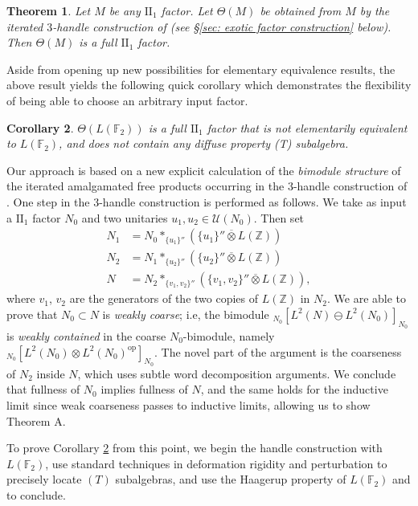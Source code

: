 \documentclass[10pt]{amsart}
\numberwithin{equation}{section}
\newtheorem{main}{Theorem}
\newtheorem{mcor}[main]{Corollary}
\theoremstyle{definition}
\newcommand{\ootimes}{\mathbin{\overline{\otimes}}}
\begin{document}
\begin{main} \label{main: fullness}
Let $M$ be any $\mathrm{II}_1$ factor.  Let $\Theta(M)$ be obtained from $M$ by the iterated $3$-handle construction of \cite{gao20253handleconstructionii1factors} (see \S \ref{sec: exotic factor construction} below).  Then $\Theta(M)$ is a full $\mathrm{II}_1$ factor.
\end{main}

Aside from opening up new possibilities for elementary equivalence results, the above result yields the following quick corollary which demonstrates the flexibility of being able to choose an arbitrary input factor.

\begin{mcor} \label{main: no relative T}
$\Theta(L(\mathbb{F}_2))$ is a full $\mathrm{II}_1$ factor that is not elementarily equivalent to $L(\mathbb{F}_2)$, and does not contain any diffuse property (T) subalgebra.
\end{mcor}



Our approach is based on a new explicit calculation of the \emph{bimodule structure} of the iterated amalgamated free products occurring in the $3$-handle construction of \cite{gao20253handleconstructionii1factors}.  One step in the $3$-handle construction is performed as follows.  We take as input a $\mathrm{II}_1$ factor $N_0$ and two unitaries $u_1,u_2\in \mathcal{U}(N_0)$.  Then set
\begin{align*}
N_1 &= N_0*_{\{u_1\}''}(\{u_1\}''\ootimes L(\mathbb{Z})) \\
N_2 &= N_1 *_{\{u_2\}''}({\{u_2\}''}\ootimes L(\mathbb{Z})) \\
N &=N_2*_{\{v_1, v_2\}''}(\{v_1, v_2\}''\ootimes L(\mathbb{Z})),
\end{align*}
where $v_1$, $v_2$ are the generators of the two copies of $L(\mathbb{Z})$ in $N_2$.  We are able to prove that $N_0\subset N$ is \emph{weakly coarse}; i.e, the bimodule $_{N_0}[L^2(N)\ominus L^2(N_0)]_{N_0}$ is \emph{weakly contained} in the coarse $N_0$-bimodule, namely $_{N_0}[L^2(N_0) \otimes L^2(N_0)^{\text{op}}]_{N_0}$.  The novel part of the argument is the coarseness of $N_2$ inside $N$, which uses subtle word decomposition arguments.  We conclude that fullness of $N_0$ implies fullness of $N$, and the same holds for the inductive limit since weak coarseness passes to inductive limits, allowing us to show Theorem A.

To prove Corollary \ref{main: no relative T} from this point, we begin the handle construction with $L(\mathbb{F}_2)$, use standard techniques in deformation rigidity and perturbation to precisely locate $(T)$ subalgebras, and use the Haagerup property of $L(\mathbb{F}_2)$ and \cite{ConnesJones} to conclude.  
\end{document}
